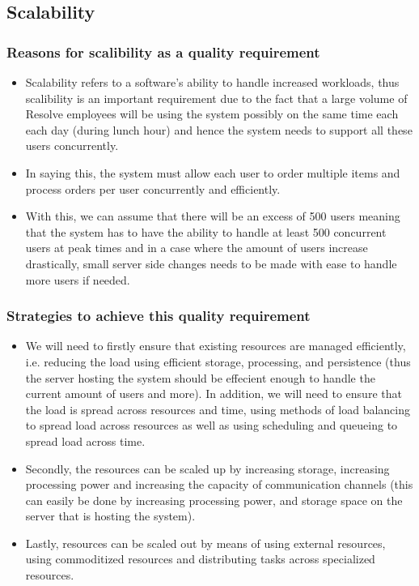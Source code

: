 \documentclass[a4paper,12pt]{article}
\begin{document}
\subsection{Scalability}
\subsubsection{Reasons for scalibility as a quality requirement}
\begin{itemize}
\item Scalability refers to a software's ability to handle increased workloads, thus scalibility is an important requirement due to the fact that a large volume of Resolve employees will be using the system possibly on the same time each each day (during lunch hour)  and hence the system needs to support all these users concurrently. 
\item In saying this, the system must allow each user to order multiple items and process orders per user concurrently and efficiently.
\item With this, we can assume that there will be an excess of 500 users meaning that the system has to have the ability to handle at least 500 concurrent users at peak times and in a case where the amount of users increase drastically, small server side changes needs to be made with ease to handle more users if needed.
\end{itemize}

\subsubsection{Strategies to achieve this quality requirement}
\begin{itemize}
\item We will need to firstly ensure that existing resources are managed efficiently, i.e. reducing the load using efficient storage, processing,  and persistence (thus the server hosting the system should be effecient enough to handle the current amount of users and more). In addition, we will need to ensure that the load is spread across resources and time, using methods of load balancing to spread load across resources as well as using scheduling and queueing to spread load across time.
\item Secondly, the resources can be scaled up by increasing storage, increasing processing power and increasing the capacity of communication channels (this can easily be done by increasing processing power, and storage space on the server that is hosting the system).
\item Lastly, resources can be scaled out by means of using external resources, using commoditized resources and distributing tasks across specialized resources.
\end{itemize}
\end{document}
